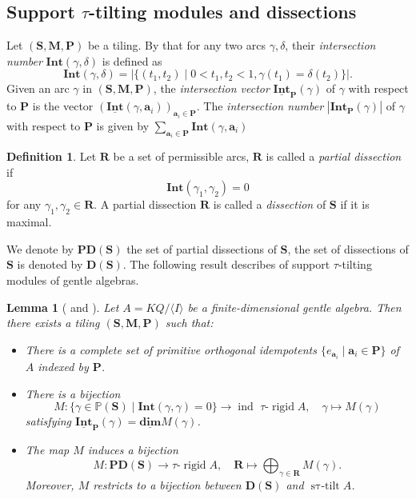 \documentclass[a4paper,10pt]{amsart}
\theoremstyle{plain}          %
\newtheorem{lemma}[theorem]{Lemma}
\theoremstyle{definition}
\newtheorem{definition}[theorem]{Definition}
\def\SS{\mathbf{S}}
\def\RR{\mathbf{R}}
\def\af{\mathbf{a}}
\def\MM{\mathbf{M}}
\def\PS{\mathbb{P}(\mathbf{S})}
\def\PP{\mathbf{P}}
\def\MM{\mathbf{M}}
\newcommand{\opname}[1]{\operatorname{#1}}
\newcommand{\Int}{\mathbf{Int}}
\newcommand{\Intv}{\underline{\mathbf{Int}}}
\newcommand{\dimv}{\underline{\mathbf{dim}}}
\newcommand{\PD}{\mathbf{PD}}
\newcommand{\D}{\mathbf{D}}
\begin{document}
\subsection{Support $\tau$-tilting modules and dissections} Let $(\SS,\MM,\PP)$ be a tiling.
By \cite[Definition 3.3]{QZ17} that for any two arcs $\gamma, \delta$, their \emph{intersection number} $\Int(\gamma,\delta)$ is defined as $$\Int(\gamma,\delta)=|\{(t_1,t_2)\mid0<t_1,t_2<1,\gamma(t_1)=\delta(t_2)\}|.$$ 
Given an arc $\gamma$ in $(\SS,\MM,\PP)$, the {\it intersection vector} $\Intv_\PP(\gamma)$ of $\gamma$ with respect to $\PP$ is the vector $(\Intv(\gamma,\af_i))_{\af_i\in\PP}$. The {\it intersection number} $|\Int_{\PP}(\gamma)|$ of $\gamma$ with respect to $\PP$ is given by $\sum_{\af_i\in\PP} \Int(\gamma,\af_i)$


\begin{definition}
  Let $\mathbf{R}$ be a set of  permissible arcs, $\mathbf{R}$ is called a {\it partial dissection} if $$\Int(\gamma_1,\gamma_2)=0$$  for any $\gamma_1,\gamma_2\in\mathbf{R}$. A partial dissection $\mathbf{R}$ is called a {\it dissection} of $\SS$ if it is maximal.
\end{definition}
We denote by $\PD(\SS)$ the set of partial  dissections of $\SS$,
the set of  dissections of $\SS$ is denoted by $\D(\SS)$. The following result describes of support $\tau$-tilting modules of  gentle algebras.
\begin{lemma}[{\cite[Theorems 2.29, 3.12]{HZZ} and \cite[Lemma 2.4]{FGLZ}}]\label{l:bijection for tau rigid}
Let $A = KQ/\langle I\rangle $ be a finite-dimensional gentle algebra. Then there exists a tiling  $(\SS,\MM,\PP)$  such that:
\begin{itemize}
    \item There is a complete set of primitive orthogonal idempotents $\{e_{\af_i} \mid \af_i \in \PP\}$ of $A$ indexed by $\PP$.
    \item There is a bijection
\[
			M: \{\gamma\in\PS\mid \Int(\gamma,\gamma)=0\}\longrightarrow\opname{ind~} \tau \text{-}\operatorname{rigid} A,\quad 
			\gamma\mapsto M(\gamma)
\]
    satisfying $\Intv_{\PP}(\gamma) = \dimv M(\gamma)$.
    \item The map $M$ induces a bijection
    \[
			 M: \PD(\SS) \longrightarrow \tau\text{-}\operatorname{rigid} A,\quad
	\RR \mapsto \bigoplus_{\gamma \in\mathbf{R}} M(\gamma).
\]
Moreover, $M$ restricts to a bijection between $\D(\SS)$ and $\opname{s\tau-tilt }  A$.
\end{itemize}
\end{lemma}
\end{document}
